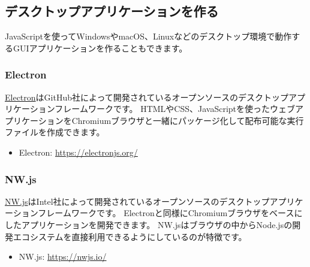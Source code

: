 \hypertarget{desktop-app}{%
\subsection{デスクトップアプリケーションを作る}\label{desktop-app}}

JavaScriptを使ってWindowsやmacOS、Linuxなどのデスクトップ環境で動作するGUIアプリケーションを作ることもできます。

\hypertarget{electron}{%
\subsubsection{Electron}\label{electron}}

\href{https://electronjs.org/}{Electron}はGitHub社によって開発されているオープンソースのデスクトップアプリケーションフレームワークです。
HTMLやCSS、JavaScriptを使ったウェブアプリケーションをChromiumブラウザと一緒にパッケージ化して配布可能な実行ファイルを作成できます。
\begin{itemize}
\item Electron: \url{https://electronjs.org/}
\end{itemize}

\hypertarget{nwjs}{%
\subsubsection{NW.js}\label{nwjs}}

\href{https://nwjs.io/}{NW.js}はIntel社によって開発されているオープンソースのデスクトップアプリケーションフレームワークです。
Electronと同様にChromiumブラウザをベースにしたアプリケーションを開発できます。
NW.jsはブラウザの中からNode.jsの開発エコシステムを直接利用できるようにしているのが特徴です。
\begin{itemize}
\item NW.js: \url{https://nwjs.io/}
\end{itemize}

